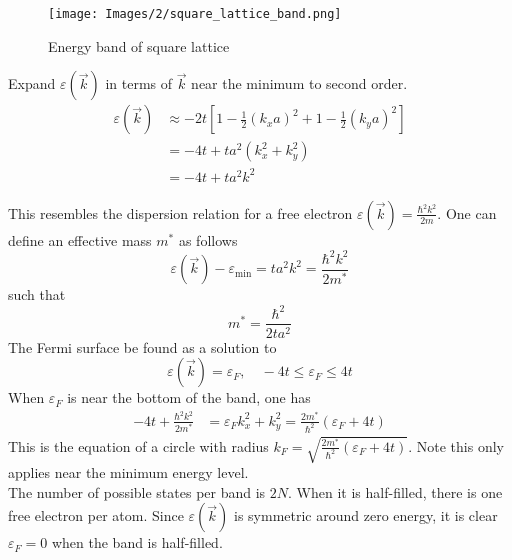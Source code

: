 \documentclass[12pt,a4paper,titlepage]{article}
\newcommand{\trm}[1]{\textrm{#1}} %
\begin{document}
\begin{figure}[H]
	\centering
	\texttt{[image: Images/2/square\_lattice\_band.png]}
	\caption{Energy band of square lattice}
\end{figure}

Expand $\varepsilon(\vec{k})$ in terms of $\vec{k}$ near the minimum to second order.
\begin{equation}
\begin{aligned}
\varepsilon(\vec{k})&\approx-2t\left[1-\frac{1}{2}(k_{x}a)^{2}+1-\frac{1}{2}(k_{y}a)^{2}\right]\\
&=-4t+ta^{2}(k_{x}^{2}+k_{y}^{2})\\
&=-4t+ta^{2}k^{2}
\end{aligned}
\end{equation}

This resembles the dispersion relation for a free electron $\varepsilon(\vec{k})=\frac{\hbar^{2}k^{2}}{2m}$. One can define an effective mass $m^{*}$ as follows
\begin{equation}
\varepsilon(\vec{k})-\varepsilon_{\trm{min}}=ta^{2}k^{2}=\frac{\hbar^{2}k^{2}}{2m^{*}}
\end{equation}
such that
\begin{equation}
m^{*}=\frac{\hbar^{2}}{2ta^{2}}
\end{equation}
The Fermi surface be found as a solution to
\begin{equation}
\varepsilon(\vec{k})=\varepsilon_{F},\quad -4t\leq\varepsilon_{F}\leq4t
\end{equation}
When $\varepsilon_{F}$ is near the bottom of the band, one has
\begin{equation}
\begin{aligned}
-4t+\frac{\hbar^{2}k^{2}}{2m^{*}}&=\varepsilon_{F}
k_{x}^{2}+k_{y}^{2}=\frac{2m^{*}}{\hbar^{2}}(\varepsilon_{F}+4t)
\end{aligned}
\end{equation}
This is the equation of a circle with radius $k_{F}=\sqrt{\frac{2m^{*}}{\hbar^{2}}(\varepsilon_{F}+4t)}$. Note this only applies near the minimum energy level.\\

The number of possible states per band is $2N$. When it is half-filled, there is one free electron per atom. Since $\varepsilon(\vec{k})$ is symmetric around zero energy, it is clear $\varepsilon_{F}=0$ when the band is half-filled.\\
\end{document}
